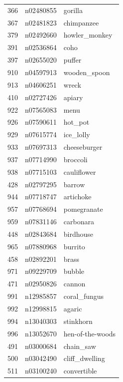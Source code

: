 \begin{table}
\begin{tabular}{cll}
366 & n02480855 & gorilla \\
367 & n02481823 & chimpanzee \\
379 & n02492660 & howler_monkey \\
391 & n02536864 & coho \\
397 & n02655020 & puffer \\
910 & n04597913 & wooden_spoon \\
913 & n04606251 & wreck \\
410 & n02727426 & apiary \\
922 & n07565083 & menu \\
926 & n07590611 & hot_pot \\
929 & n07615774 & ice_lolly \\
933 & n07697313 & cheeseburger \\
937 & n07714990 & broccoli \\
938 & n07715103 & cauliflower \\
428 & n02797295 & barrow \\
944 & n07718747 & artichoke \\
957 & n07768694 & pomegranate \\
959 & n07831146 & carbonara \\
448 & n02843684 & birdhouse \\
965 & n07880968 & burrito \\
458 & n02892201 & brass \\
971 & n09229709 & bubble \\
471 & n02950826 & cannon \\
991 & n12985857 & coral_fungus \\
992 & n12998815 & agaric \\
994 & n13040303 & stinkhorn \\
996 & n13052670 & hen-of-the-woods \\
491 & n03000684 & chain_saw \\
500 & n03042490 & cliff_dwelling \\
511 & n03100240 & convertible \\
\bottomrule
\end{tabular}
\end{table}
